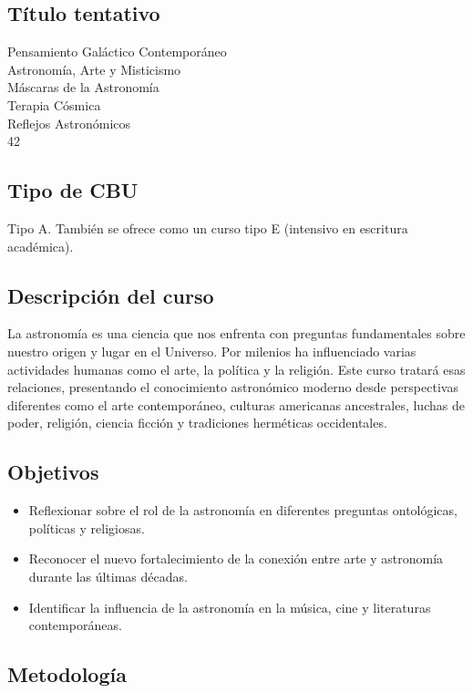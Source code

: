 \documentclass{report}
\begin{document}
\subsection*{\bf T\'itulo tentativo}
Pensamiento Gal\'actico Contempor\'aneo\\
Astronom\'ia, Arte y Misticismo\\
M\'ascaras de la Astronom\'ia\\
Terapia C\'osmica\\
Reflejos Astron\'omicos\\
42\\

\subsection*{Tipo de CBU}
Tipo A. Tambi\'en se ofrece como un curso tipo E (intensivo en
escritura acad\'emica). 


\subsection*{Descripci\'on del curso}
La astronom\'ia es una ciencia que nos enfrenta con preguntas
fundamentales sobre nuestro origen y lugar en el Universo. Por
milenios ha influenciado varias actividades humanas como el arte, la
pol\'itica y la religi\'on. Este curso tratar\'a esas relaciones,
presentando el conocimiento astron\'omico moderno desde perspectivas
diferentes como el arte contempor\'aneo, culturas americanas
ancestrales, luchas de poder, religi\'on, ciencia ficci\'on y
tradiciones herm\'eticas occidentales.   
\subsection*{Objetivos}

\begin{itemize}
\item Reflexionar sobre el rol de la astronom\'ia en diferentes
  preguntas ontol\'ogicas, pol\'iticas y religiosas. 
\item Reconocer el nuevo fortalecimiento de la conexi\'on entre arte y
  astronom\'ia durante las \'ultimas d\'ecadas.
\item Identificar la influencia de la astronom\'ia en la m\'usica,
  cine y literaturas contempor\'aneas.
\end{itemize}

\subsection*{Metodolog\'ia}
\end{document}

